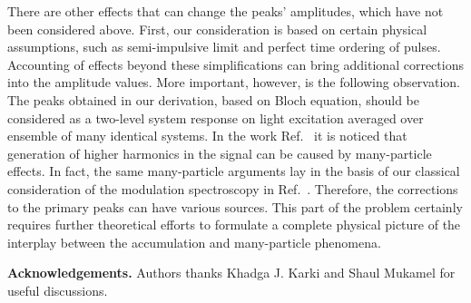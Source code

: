 \documentclass[prb,twocolumn,showpacs,epsfig,epsf]{revtex4}
\newcommand{\1}{\mathds{1}}
\begin{document}
There are other effects that can change the peaks' amplitudes, which have not been considered above. First, our consideration is based on certain physical assumptions, such as semi-impulsive limit and perfect time ordering of pulses. Accounting of effects beyond these simplifications can bring additional corrections into the amplitude values. More important, however, is the following observation. The peaks obtained in our derivation, based on Bloch equation, should be considered as a two-level system response on light excitation averaged over ensemble of many identical systems. In the work Ref.~\cite{M2016} it is noticed that generation of higher harmonics in the signal can be caused by many-particle effects. In fact, the same many-particle arguments lay in the basis of our classical consideration of the modulation spectroscopy in Ref.~\cite{our}. Therefore, the corrections to the primary peaks can have various sources. This part of the problem certainly requires further theoretical efforts to formulate a complete physical picture of the interplay between the accumulation and many-particle phenomena.
\vspace{10pt}




{\bf Acknowledgements.} Authors thanks Khadga J. Karki and Shaul Mukamel for useful discussions.
\end{document}

